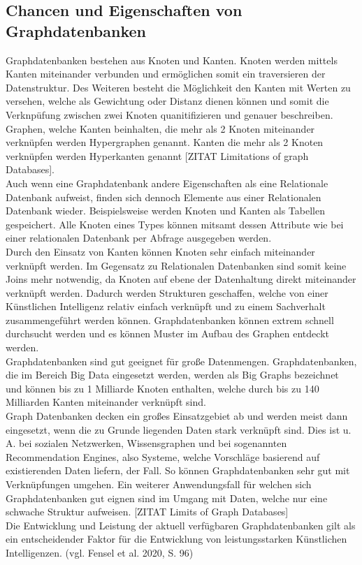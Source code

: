 \subsection{Chancen und Eigenschaften von Graphdatenbanken}
Graphdatenbanken bestehen aus Knoten und Kanten. Knoten werden mittels Kanten miteinander verbunden und ermöglichen somit ein traversieren der Datenstruktur. Des Weiteren besteht die Möglichkeit den Kanten mit Werten zu versehen, welche als Gewichtung oder Distanz dienen können und somit die Verknpüfung zwischen zwei Knoten quanitifizieren und genauer beschreiben. Graphen, welche Kanten beinhalten, die mehr als 2 Knoten miteinander verknüpfen werden Hypergraphen genannt. Kanten die mehr als 2 Knoten verknüpfen werden Hyperkanten genannt [ZITAT Limitations of graph Databases]. \\Auch wenn eine Graphdatenbank andere Eigenschaften als eine Relationale Datenbank aufweist, finden sich dennoch Elemente aus einer Relationalen Datenbank wieder. Beispielsweise werden Knoten und Kanten als Tabellen gespeichert. Alle Knoten eines Types können mitsamt dessen Attribute wie bei einer relationalen Datenbank per Abfrage ausgegeben werden.\\
Durch den Einsatz von Kanten können Knoten sehr einfach miteinander verknüpft werden. Im Gegensatz zu Relationalen Datenbanken sind somit keine Joins mehr notwendig, da Knoten auf ebene der Datenhaltung direkt miteinander verknüpft werden. Dadurch werden Strukturen geschaffen, welche von einer Künstlichen Intelligenz relativ einfach verknüpft und zu einem Sachverhalt zusammengeführt werden können.
Graphdatenbanken können extrem schnell durchsucht werden und es können Muster im Aufbau des Graphen entdeckt werden.\\
Graphdatenbanken sind gut geeignet für große Datenmengen. Graphdatenbanken, die im Bereich Big Data eingesetzt werden, werden als \glqq Big Graphs\grqq\: bezeichnet und können bis zu 1 Milliarde Knoten enthalten, welche durch bis zu 140 Milliarden Kanten miteinander verknüpft sind.\\
Graph Datenbanken decken ein großes Einsatzgebiet ab und werden meist dann eingesetzt, wenn die zu Grunde liegenden Daten stark verknüpft sind. Dies ist u. A. bei sozialen Netzwerken, Wissensgraphen und bei sogenannten Recommendation Engines, also Systeme, welche Vorschläge basierend auf existierenden Daten liefern, der Fall. So können Graphdatenbanken sehr gut mit Verknüpfungen umgehen. Ein weiterer Anwendungsfall für welchen sich Graphdatenbanken gut eignen sind im Umgang mit Daten, welche nur eine schwache Struktur aufweisen. [ZITAT Limits of Graph Databases] \\
Die Entwicklung und Leistung der aktuell verfügbaren Graphdatenbanken gilt als ein entscheidender Faktor für die Entwicklung von leistungsstarken Künstlichen Intelligenzen. (vgl. Fensel et al. 2020, S. 96)
